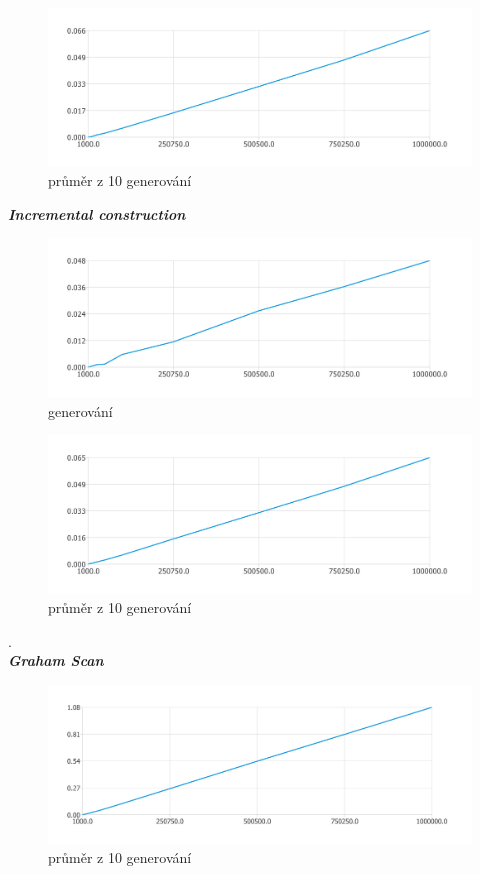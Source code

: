 \documentclass{article}
\begin{document}
\begin{figure}[htbp]
\centering
        \includegraphics[clip, trim=0cm 0cm 0cm 0cm, width=1\textwidth]{clq.pdf}
        \caption{průměr z 10 generování}
\end{figure}
\clearpage
\newpage
\textit{\textbf {Incremental construction}}
\\
\begin{figure}[htbp]
\centering
        \includegraphics[clip, trim=0cm 0cm 0cm 0cm, width=1\textwidth]{pdf25.pdf}
        \caption{generování}
\end{figure}
\begin{figure}[htbp]
\centering
        \includegraphics[clip, trim=0cm 0cm 0cm 0cm, width=1\textwidth]{cli.pdf}
        \caption{průměr z 10 generování}
\end{figure}
.\\
\clearpage
\newpage
\textit{\textbf {Graham Scan}}
\\
\begin{figure}[htbp]
\centering
        \includegraphics[clip, trim=0cm 0cm 0cm 0cm, width=1\textwidth]{cgs.pdf}
        \caption{průměr z 10 generování}
\end{figure}
\bigskip
\clearpage
\end{document}
